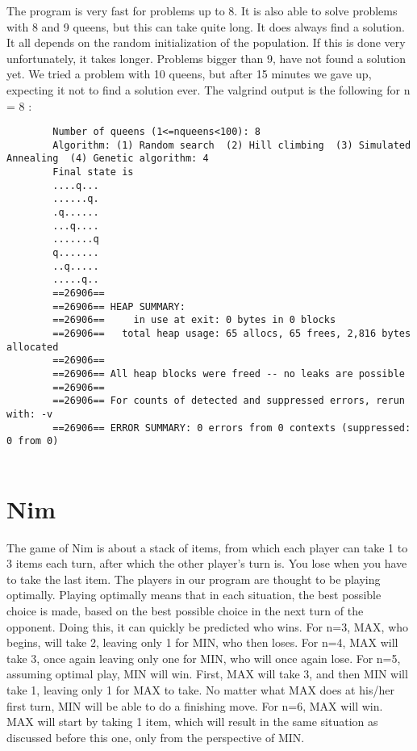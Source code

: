 \documentclass{article}
\begin{document}
	The program is very fast for problems up to 8. It is also able to solve problems with 8 and 9 queens, but this can take quite long. It does always find a solution. It all depends on the random initialization of the population. If this is done very unfortunately, it takes longer. Problems bigger than 9, have not found a solution yet. We tried a problem with 10 queens, but after 15 minutes we gave up, expecting it not to find a solution ever. The valgrind output is the following for n = 8 :
		\begin{lstlisting}
		Number of queens (1<=nqueens<100): 8
		Algorithm: (1) Random search  (2) Hill climbing  (3) Simulated Annealing  (4) Genetic algorithm: 4
		Final state is
		....q...
		......q.
		.q......
		...q....
		.......q
		q.......
		..q.....
		.....q..
		==26906== 
		==26906== HEAP SUMMARY:
		==26906==     in use at exit: 0 bytes in 0 blocks
		==26906==   total heap usage: 65 allocs, 65 frees, 2,816 bytes allocated
		==26906== 
		==26906== All heap blocks were freed -- no leaks are possible
		==26906== 
		==26906== For counts of detected and suppressed errors, rerun with: -v
		==26906== ERROR SUMMARY: 0 errors from 0 contexts (suppressed: 0 from 0)
		
		\end{lstlisting}
		
	
	\section{Nim}
	
	The game of Nim is about a stack of items, from which each player can take 1 to 3 items each turn, after which the other player's turn is. You lose when you have to take the last item. The players in our program are thought to be playing optimally. Playing optimally means that in each situation, the best possible choice is made, based on the best possible choice in the next turn of the opponent. Doing this, it can quickly be predicted who wins. For n=3, MAX, who begins, will take 2, leaving only 1 for MIN, who then loses. For n=4, MAX will take 3, once again leaving only one for MIN, who will once again lose. For n=5, assuming optimal play, MIN will win. First, MAX will take 3, and then MIN will take 1, leaving only 1 for MAX to take. No matter what MAX does at his/her first turn, MIN will be able to do a finishing move. For n=6, MAX will win. MAX will start by taking 1 item, which will result in the same situation as discussed before this one, only from the perspective of MIN.
	
\end{document}
